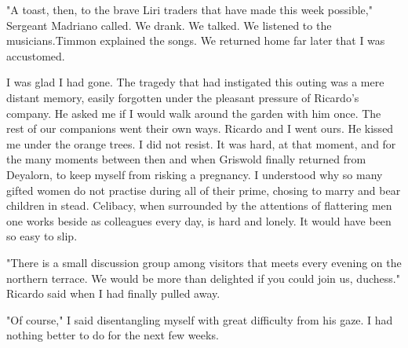 \documentclass{article}
\begin{document}
"A toast, then, to the brave Liri traders that have made this week possible," Sergeant Madriano called. We drank. We talked. We listened to the musicians.Timmon explained the songs. We returned home far later that I was accustomed. 

I was glad I had gone. The tragedy that had instigated this outing was a mere distant memory, easily forgotten under the pleasant pressure of Ricardo's company. He asked me if I would walk around the garden with him once. The rest of our companions went their own ways. Ricardo and I went ours. He kissed me under the orange trees. I did not resist. It was hard, at that moment, and for the many moments between then and when Griswold finally returned from Deyalorn, to keep myself from risking a pregnancy. I understood why so many gifted women do not practise during all of their prime, chosing to marry and bear children in stead. Celibacy, when surrounded by the attentions of flattering men one works beside as colleagues every day, is hard and lonely. It would have been so easy to slip. 
 
"There is a small discussion group among visitors that meets every evening on the northern terrace. We would be more than delighted if you could join us, duchess." Ricardo said when I had finally pulled away. 

"Of course," I said disentangling myself with great difficulty from his gaze. I had nothing better to do for the next few weeks. 

\vspace{.5cm}
\end{document}
